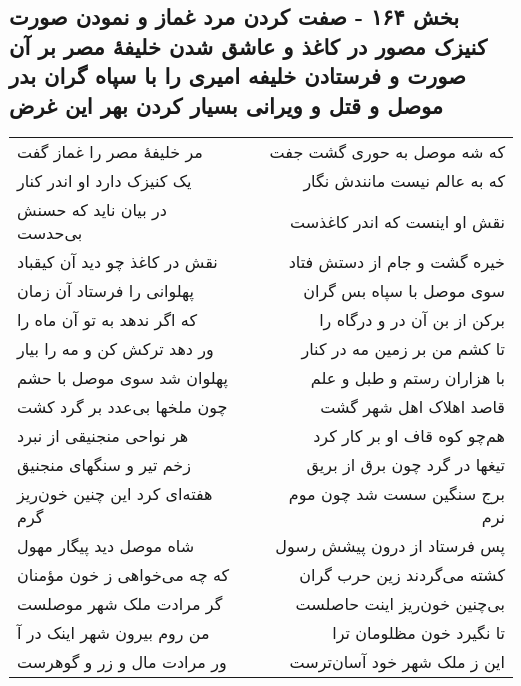 \begin{center}
\section*{بخش ۱۶۴ - صفت کردن مرد غماز و نمودن صورت کنیزک مصور در کاغذ و عاشق شدن خلیفهٔ مصر بر آن صورت و فرستادن خلیفه امیری را با سپاه گران بدر موصل و قتل و ویرانی بسیار کردن بهر این غرض}
\label{sec:sh164}
\begin{longtable}{l p{0.5cm} r}
مر خلیفهٔ مصر را غماز گفت
&&
که شه موصل به حوری گشت جفت
\\
یک کنیزک دارد او اندر کنار
&&
که به عالم نیست مانندش نگار
\\
در بیان ناید که حسنش بی‌حدست
&&
نقش او اینست که اندر کاغذست
\\
نقش در کاغذ چو دید آن کیقباد
&&
خیره گشت و جام از دستش فتاد
\\
پهلوانی را فرستاد آن زمان
&&
سوی موصل با سپاه بس گران
\\
که اگر ندهد به تو آن ماه را
&&
برکن از بن آن در و درگاه را
\\
ور دهد ترکش کن و مه را بیار
&&
تا کشم من بر زمین مه در کنار
\\
پهلوان شد سوی موصل با حشم
&&
با هزاران رستم و طبل و علم
\\
چون ملخها بی‌عدد بر گرد کشت
&&
قاصد اهلاک اهل شهر گشت
\\
هر نواحی منجنیقی از نبرد
&&
هم‌چو کوه قاف او بر کار کرد
\\
زخم تیر و سنگهای منجنیق
&&
تیغها در گرد چون برق از بریق
\\
هفته‌ای کرد این چنین خون‌ریز گرم
&&
برج سنگین سست شد چون موم نرم
\\
شاه موصل دید پیگار مهول
&&
پس فرستاد از درون پیشش رسول
\\
که چه می‌خواهی ز خون مؤمنان
&&
کشته می‌گردند زین حرب گران
\\
گر مرادت ملک شهر موصلست
&&
بی‌چنین خون‌ریز اینت حاصلست
\\
من روم بیرون شهر اینک در آ
&&
تا نگیرد خون مظلومان ترا
\\
ور مرادت مال و زر و گوهرست
&&
این ز ملک شهر خود آسان‌ترست
\\
\end{longtable}
\end{center}
